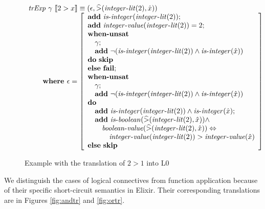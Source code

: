 \begin{figure}
\[
\begin{array}{l}
\mathit{trExp}~\gamma~\llbracket2 > x\rrbracket \equiv (\epsilon, \widehat{>}(\mathit{integer\mbox{-}lit}(2),\hat{x}))\\
\qquad \textbf{where } \epsilon = \left[ 
\begin{array}{l}
\textbf{add}~\mathit{is\mbox{-}integer}(\mathit{integer\mbox{-}lit}(2));\\
\textbf{add}~\mathit{integer\mbox{-}value}(\mathit{integer\mbox{-}lit}(2)) = 2;\\
\textbf{when-unsat}\\
\quad\gamma;\\
\quad\textbf{add}~\neg(\mathit{is\mbox{-}integer}(\mathit{integer\mbox{-}lit}(2)) \wedge \mathit{is\mbox{-}integer}(\hat{x}))\\
\textbf{do}~\textbf{skip}\\
\textbf{else}~\textbf{fail};\\
\textbf{when-unsat}\\
\quad\gamma;\\
\quad\textbf{add}~\neg(\mathit{is\mbox{-}integer}(\mathit{integer\mbox{-}lit}(2)) \wedge \mathit{is\mbox{-}integer}(\hat{x}))\\
\textbf{do}\\
\quad\textbf{add}~\mathit{is\mbox{-}integer}(\mathit{integer\mbox{-}lit}(2)) \wedge \mathit{is\mbox{-}integer}(\hat{x});\\
\quad\textbf{add}~\mathit{is\mbox{-}boolean}(\widehat{>}(\mathit{integer\mbox{-}lit}(2),\hat{x})) \wedge \\ 
\quad\quad\mathit{boolean\mbox{-}value}(\widehat{>}(\mathit{integer\mbox{-}lit}(2),\hat{x})) \Leftrightarrow \\
\quad\quad\quad\mathit{integer\mbox{-}value}(\mathit{integer\mbox{-}lit}(2)) > \mathit{integer\mbox{-}value}(\hat{x})\\
\textbf{else}~\textbf{skip}\\
\end{array}
\right]
\end{array}
\]
\caption{Example with the translation of $2 > 1$ into L0}
\label{fig:exaptr}
\end{figure}

We distinguish the cases of logical connectives from function application
because of their specific short-circuit semantics in Elixir. Their corresponding 
translations are in Figures \ref{fig:andtr} and \ref{fig:ortr}.

